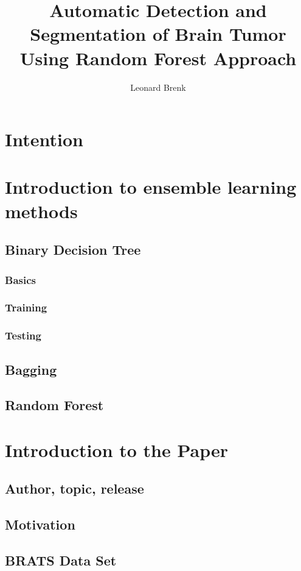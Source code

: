 \documentclass{article}
\title{Automatic Detection and Segmentation of Brain Tumor Using Random Forest Approach}
\author{Leonard Brenk}
\begin{document}
 \maketitle

 \newpage

 \tableofcontents

 \newpage

 \section{Intention}
 \section{Introduction to ensemble learning methods}
 \subsection{Binary Decision Tree}
 \subsubsection{Basics}
 \subsubsection{Training}
 \subsubsection{Testing}
 \subsection{Bagging}
 \subsection{Random Forest}

 \section{Introduction to the Paper}
 \subsection{Author, topic, release}
 \subsection{Motivation}
 \subsection{BRATS Data Set}
\end{document}
